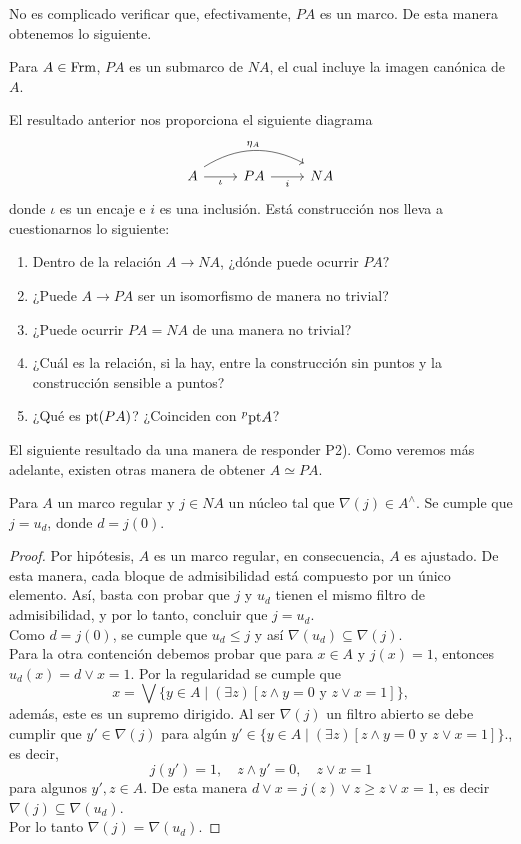 No es complicado verificar que, efectivamente, $PA$ es un marco. De esta manera obtenemos lo siguiente.

\begin{thm}\label{Teorema7.1.3}
    Para $A\in \mathrm{Frm}$, $PA$ es un submarco de $NA$, el cual incluye la imagen canónica de $A$.
\end{thm}

El resultado anterior nos proporciona el siguiente diagrama
\[
\begin{tikzcd}
A \arrow[r, "\iota"'] \arrow[rr, "\eta_A", bend left, shift left] & PA \arrow[r, "i"'] & NA
\end{tikzcd}
\]
donde $\iota$ es un encaje e $i$ es una inclusión. Está construcción nos lleva a cuestionarnos lo siguiente:
\begin{enumerate}[P1)]
    \item Dentro de la relación $A\to NA$, ¿dónde puede ocurrir $PA?$
    \item ¿Puede $A\to PA$ ser un isomorfismo de manera no trivial?
    \item ¿Puede ocurrir $PA=NA$ de una manera no trivial?
    \item ¿Cuál es la relación, si la hay, entre la construcción sin puntos y la construcción sensible a puntos?
    \item ¿Qué es $\mathrm{pt} (PA)$? ¿Coinciden con $^p\mathrm{pt} A$?
\end{enumerate}

El siguiente resultado da una manera de responder P2). Como veremos más adelante, existen otras manera de obtener $A\simeq PA$.

\begin{thm}\label{Teorema7.1.4}
    Para $A$ un marco regular y $j\in NA$ un núcleo tal que $\nabla(j)\in A^\wedge$. Se cumple que $j=u_d$, donde $d=j(0)$. 
\end{thm}

\begin{proof}
    Por hipótesis, $A$ es un marco regular, en consecuencia, $A$ es ajustado. De esta manera, cada bloque de admisibilidad está compuesto por un único elemento. Así, basta con probar que $j$ y $u_d$ tienen el mismo filtro de admisibilidad, y por lo tanto, concluir que $j=u_d$.\\

    Como $d=j(0)$, se cumple que $u_d\leq j$ y así $\nabla(u_d)\subseteq \nabla(j)$.\\
    
    Para la otra contención debemos probar que para $x\in A$ y $j(x)=1$, entonces $u_d(x)=d\vee x=1$. Por la regularidad se cumple que 
    \[
    x=\bigvee\{y\in A\mid (\exists z)[z\wedge y=0 \mbox{ y } z\vee x=1]\},
    \]
    además, este es un supremo dirigido. Al ser $\nabla(j)$ un filtro abierto se debe cumplir que $y'\in\nabla(j)$ para algún $y'\in \{y\in A\mid (\exists z)[z\wedge y=0 \mbox{ y } z\vee x=1]\}$., es decir,
    \[
    j(y')=1, \quad z\wedge y'=0, \quad z\vee x=1
    \]
    para algunos $y', z\in A$. De esta manera $d\vee x=j(z)\vee z\geq z\vee x=1$, es decir $\nabla(j)\subseteq\nabla(u_d)$.\\

    Por lo tanto $\nabla(j)=\nabla(u_d)$.
\end{proof}

